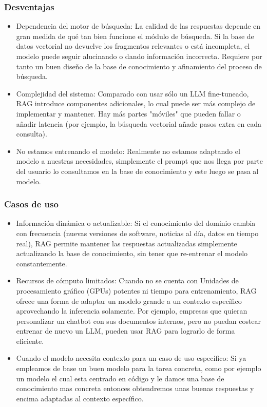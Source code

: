 \subsubsection{Desventajas}

\begin{itemize}
    \item Dependencia del motor de búsqueda: La calidad de las respuestas depende en gran medida de qué tan bien funcione el módulo de búsqueda. Si la base de datos vectorial no devuelve los fragmentos relevantes o está incompleta, el modelo puede seguir alucinando o dando información incorrecta. Requiere por tanto un buen diseño de la base de conocimiento y afinamiento del proceso de búsqueda.

    \item Complejidad del sistema: Comparado con usar sólo un LLM fine-tuneado, RAG introduce componentes adicionales, lo cual puede ser más complejo de implementar y mantener. Hay más partes "móviles" que pueden fallar o añadir latencia (por ejemplo, la búsqueda vectorial añade pasos extra en cada consulta).

    \item No estamos entrenando el modelo: Realmente no estamos adaptando el modelo a nuestras necesidades, simplemente el prompt que nos llega por parte del usuario lo consultamos en la base de conocimiento y este luego se pasa al modelo.
\end{itemize}

\subsubsection{Casos de uso}
\begin{itemize}
    \item Información dinámica o actualizable: Si el conocimiento del dominio cambia con frecuencia (nuevas versiones de software, noticias al día, datos en tiempo real), RAG permite mantener las respuestas actualizadas simplemente actualizando la base de conocimiento, sin tener que re-entrenar el modelo constantemente.

    \item Recursos de cómputo limitados: Cuando no se cuenta con Unidades de procesamiento gráfico (GPUs) potentes ni tiempo para entrenamiento, RAG ofrece una forma de adaptar un modelo grande a un contexto específico aprovechando la inferencia solamente. Por ejemplo, empresas que quieran personalizar un chatbot con sus documentos internos, pero no puedan costear entrenar de nuevo un LLM, pueden usar RAG para lograrlo de forma eficiente.

    \item Cuando el modelo necesita contexto para un caso de uso específico: Si ya empleamos de base un buen modelo para la tarea concreta, como por ejemplo un modelo el cual esta centrado en código y le damos una base de conocimiento mas concreta entonces obtendremos unas buenas respuestas y encima adaptadas al contexto específico.
\end{itemize}

